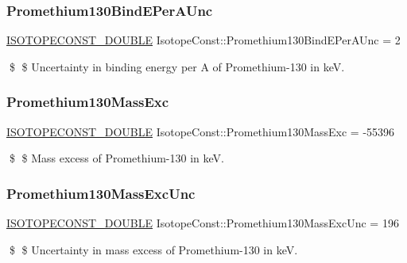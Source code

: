 \subsubsection{\texorpdfstring{Promethium130\+Bind\+E\+Per\+A\+Unc}{Promethium130BindEPerAUnc}}
{\footnotesize\ttfamily \mbox{\hyperlink{group___isotope_const-_macros_ga8f45a7272ce02c0b4c65c44636ed719a}{I\+S\+O\+T\+O\+P\+E\+C\+O\+N\+S\+T\+\_\+\+D\+O\+U\+B\+LE}} Isotope\+Const\+::\+Promethium130\+Bind\+E\+Per\+A\+Unc = 2}

\$ \$ Uncertainty in binding energy per A of Promethium-\/130 in keV. \mbox{\label{group___isotope_const-_promethium-_pm130_gaac54ed5adc57182ccd711c1cf7727778}} 
\subsubsection{\texorpdfstring{Promethium130\+Mass\+Exc}{Promethium130MassExc}}
{\footnotesize\ttfamily \mbox{\hyperlink{group___isotope_const-_macros_ga8f45a7272ce02c0b4c65c44636ed719a}{I\+S\+O\+T\+O\+P\+E\+C\+O\+N\+S\+T\+\_\+\+D\+O\+U\+B\+LE}} Isotope\+Const\+::\+Promethium130\+Mass\+Exc = -\/55396}

\$ \$ Mass excess of Promethium-\/130 in keV. \mbox{\label{group___isotope_const-_promethium-_pm130_gaf9670cdd044f2b0f38f40c39381f9b56}} 
\subsubsection{\texorpdfstring{Promethium130\+Mass\+Exc\+Unc}{Promethium130MassExcUnc}}
{\footnotesize\ttfamily \mbox{\hyperlink{group___isotope_const-_macros_ga8f45a7272ce02c0b4c65c44636ed719a}{I\+S\+O\+T\+O\+P\+E\+C\+O\+N\+S\+T\+\_\+\+D\+O\+U\+B\+LE}} Isotope\+Const\+::\+Promethium130\+Mass\+Exc\+Unc = 196}

\$ \$ Uncertainty in mass excess of Promethium-\/130 in keV. \mbox{\label{group___isotope_const-_promethium-_pm130_ga7655ac87e790de40cdc57e3e1cfac63a}} 
